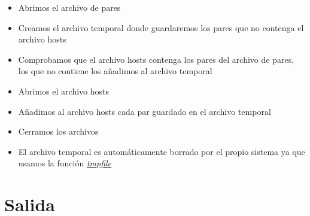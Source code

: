 	\begin{itemize}
		\item Abrimos el archivo de pares
		\item Creamos el archivo temporal donde guardaremos los pares que no contenga el archivo hosts
		\item Comprobamos que el archivo hosts contenga los pares del archivo de pares, los que no contiene los añadimos al archivo temporal
		\item Abrimos el archivo hosts
		\item Añadimos al archivo hosts cada par guardado en el archivo temporal
		\item Cerramos los archivos
		\item El archivo temporal es automáticamente borrado por el propio sistema ya que usamos la función \href{https://www.tutorialspoint.com/c_standard_library/c_function_tmpfile.htm}{\textit{tmpfile}}
	\end{itemize}

\section{Salida}
